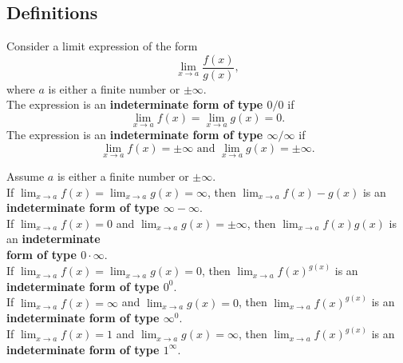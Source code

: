 \subsection*{Definitions}
\begin{namedtheorem}Consider a limit expression of the form
  \[
  \lim_{x\to a}\frac{f(x)}{g(x)},
  \]
  where $a$ is either a finite number or $\pm\infty$.
  \vspace{.1in}
  \\
  The expression is an {\bf indeterminate form of type $0/0$} if
  \[
  \lim_{x\to a}f(x)=\lim_{x\to a}g(x)=0.
  \]
  The expression is an {\bf indeterminate form of type $\infty/\infty$} if
  \[
  \lim_{x\to a}f(x)=\pm\infty \text{ and } \lim_{x\to a}g(x)=\pm\infty.
  \]

\end{namedtheorem}
\begin{comment}
  A limit expression having an indeterminate form does {\em not} mean that the limit does not exist. You should interpret this conclusion as saying simply that our current analysis is not detailed enough to determine whether the limit exists and/or what that limit is.
  \vspace{.1in}
  \\
  In this spirit, we will be careful {\em not} to write
  \[
  \lim_{x\to a}\frac{f(x)}{g(x)}=\frac{0}{0} \text{ or } \lim_{x\to a}\frac{f(x)}{g(x)}=\frac{\infty}{\infty},
  \]
  as this suggests we are asserting something more definitive about the limit.

\end{comment}
\begin{namedtheorem} Assume $a$ is either a finite number or $\pm\infty$.
  \vspace{.1in}
  \\
  If $\displaystyle\lim_{x\to a}f(x)=\lim_{x\to a}g(x)=\infty$, then
  $\displaystyle\lim_{x\to a}f(x)-g(x)$ is an {\bf indeterminate form of type $\infty-\infty$}.
  \vspace{.1in}
  \\
  If $\displaystyle\lim_{x\to a}f(x)=0$ and $\lim_{x\to a}g(x)=\pm\infty$, then
  $\displaystyle\lim_{x\to a}f(x)g(x)$ is an {\bf indeterminate \\ form of type $0\cdot\infty$}.
  \vspace{.1in}
  \\
  If $\displaystyle\lim_{x\to a}f(x)=\lim_{x\to a}g(x)=0$, then
  $\displaystyle\lim_{x\to a}f(x)^{g(x)}$ is an {\bf indeterminate form of type $0^0$}.
  \vspace{.1in}
  \\
  If $\displaystyle\lim_{x\to a}f(x)=\infty$ and $\lim_{x\to a}g(x)=0$, then
  $\displaystyle\lim_{x\to a}f(x)^{g(x)}$ is an {\bf indeterminate form  of type $\infty^0$}.
  \vspace{.1in}
  \\
  If $\displaystyle\lim_{x\to a}f(x)=1$ and $\lim_{x\to a}g(x)=\infty$, then
  $\displaystyle\lim_{x\to a}f(x)^{g(x)}$ is an {\bf indeterminate form of type $1^\infty$}.

\end{namedtheorem}

